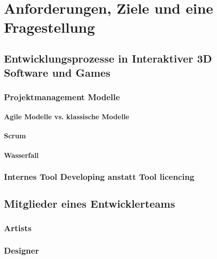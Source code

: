 \documentclass[pagesize, paper=a4, fontsize=12pt,titlepage=true, headings=small, headnosepline, abstractoff, liststotoc, nochapterprefix, plainheadsepline, twoside]{scrreprt}
\begin{document}

\renewcommand*{\chapterpagestyle}{plain}
\pagestyle{plain}
\setcounter{page}{0}

\chapter{Anforderungen, Ziele und eine Fragestellung}

\section{Entwicklungsprozesse in Interaktiver 3D Software und Games}
\subsection{Projektmanagement Modelle}
\subsubsection{Agile Modelle vs. klassische Modelle}
\subsubsection{Scrum}
\subsubsection{Wasserfall}

\subsection{Internes Tool Developing anstatt Tool licencing} %

\section{Mitglieder eines Entwicklerteams}
\subsection{Artists}
\subsection{Designer}
\end{document}
